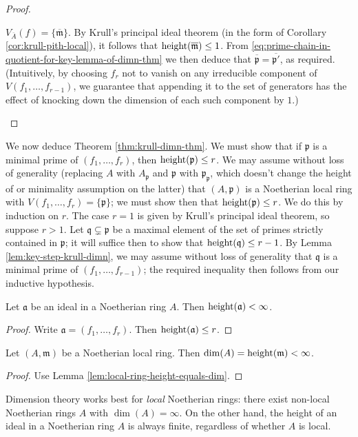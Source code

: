 \documentclass[reqno]{amsart}
\begin{document}
\begin{proof}
\begin{enumerate}
    $V_{\overline{A}}(f)
    = \{\overline{\mathfrak{m}}\}$.    
    By Krull's principal
    ideal theorem (in the form of Corollary \ref{cor:krull-pith-local}),
    it follows that $\operatorname{height}(\overline{\mathfrak{m} }) \leq 1$.
    From
    \eqref{eq:prime-chain-in-quotient-for-key-lemma-of-dimn-thm}
    we then deduce that $\overline{\mathfrak{p} } =
    \overline{\mathfrak{p}'}$,
    as required.
    (Intuitively, by choosing $f_r$ not to vanish on any irreducible component
    of $V(f_1,\dotsc,f_{r-1})$,
    we guarantee that appending it to the set of generators has the effect
    of knocking down the dimension of each such component by $1$.)
  \end{enumerate}
\end{proof}

We now deduce Theorem \ref{thm:krull-dimn-thm}.  We must show that if \(\mathfrak{p}\) is a minimal prime of \((f_1,\dotsc,f_r)\), then \(\operatorname{height}(\mathfrak{p}) \leq r\).  We may assume without loss of generality (replacing \(A\) with \(A_\mathfrak{p}\) and \(\mathfrak{p}\) with \(\mathfrak{p}_\mathfrak{p}\), which doesn't change the height of or minimality assumption on the latter) that \((A,\mathfrak{p})\) is a Noetherian local ring with \(V(f_1,\dotsc,f_r) = \{\mathfrak{p}\}\); we must show then that \(\operatorname{height}(\mathfrak{p}) \leq r\).  We do this by induction on \(r\).  The case \(r = 1\) is given by Krull's principal ideal theorem, so suppose \(r > 1\).  Let \(\mathfrak{q} \subsetneq \mathfrak{p}\) be a maximal element of the set of primes strictly contained in \(\mathfrak{p}\); it will suffice then to show that \(\operatorname{height}(\mathfrak{q}) \leq r-1\).  By Lemma \ref{lem:key-step-krull-dimn}, we may assume without loss of generality that \(\mathfrak{q}\) is a minimal prime of \((f_1,\dotsc,f_{r-1})\); the required inequality then follows from our inductive hypothesis.

\begin{corollary}
  Let $\mathfrak{a}$ be an ideal in a Noetherian ring $A$.
  Then $\operatorname{height}(\mathfrak{a}) < \infty$.
\end{corollary}
\begin{proof}
  Write $\mathfrak{a} = (f_1,\dotsc,f_r)$.
  Then $\operatorname{height}(\mathfrak{a}) \leq r$.
\end{proof}
\begin{corollary}
  Let $(A,\mathfrak{m})$ be a Noetherian local ring.
  Then $\dim(A) = \operatorname{height}(\mathfrak{m}) < \infty$.
\end{corollary}
\begin{proof}
Use Lemma \ref{lem:local-ring-height-equals-dim}.
\end{proof}
\begin{remark}
  Dimension theory works best for \emph{local} Noetherian rings:
  there exist non-local Noetherian rings $A$ with
  $\dim(A) = \infty$.  On the other hand, the height of an ideal
  in a Noetherian ring $A$ is always finite, regardless of
  whether $A$ is local.
\end{remark}
\end{document}
